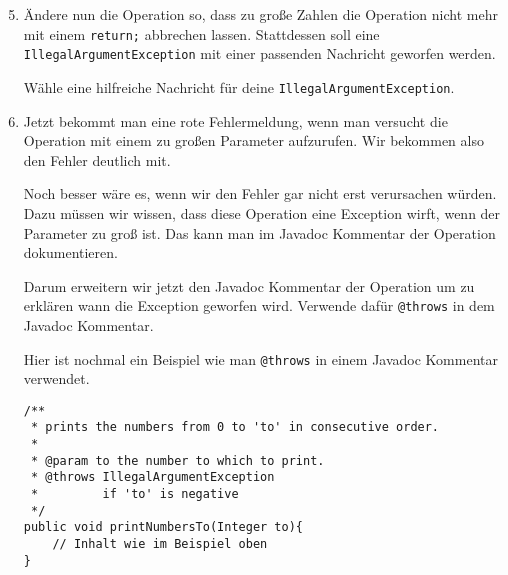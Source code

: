 \begin{enumerate}\setcounter{enumi}{4}
	\item
		Ändere nun die Operation so, dass zu große Zahlen die Operation nicht mehr mit einem \lstinline{return;} abbrechen lassen.
		Stattdessen soll eine \lstinline{IllegalArgumentException} mit einer passenden Nachricht geworfen werden.

		Wähle eine hilfreiche Nachricht für deine \lstinline{IllegalArgumentException}.

	\item
		Jetzt bekommt man eine rote Fehlermeldung, wenn man versucht die Operation mit einem zu großen Parameter aufzurufen.
		Wir bekommen also den Fehler deutlich mit.

		Noch besser wäre es, wenn wir den Fehler gar nicht erst verursachen würden.
		Dazu müssen wir wissen, dass diese Operation eine Exception wirft, wenn der Parameter zu groß ist.
		Das kann man im Javadoc Kommentar der Operation dokumentieren.

		Darum erweitern wir jetzt den Javadoc Kommentar der Operation um zu erklären wann die Exception geworfen wird.
		Verwende dafür \lstinline{@throws} in dem Javadoc Kommentar.

		Hier ist nochmal ein Beispiel wie man \lstinline{@throws} in einem Javadoc Kommentar verwendet.

		\begin{lstlisting}
/**
 * prints the numbers from 0 to 'to' in consecutive order.
 *
 * @param to the number to which to print.
 * @throws IllegalArgumentException
 *         if 'to' is negative
 */
public void printNumbersTo(Integer to){
    // Inhalt wie im Beispiel oben
}
		\end{lstlisting}
\end{enumerate}
\newpage
